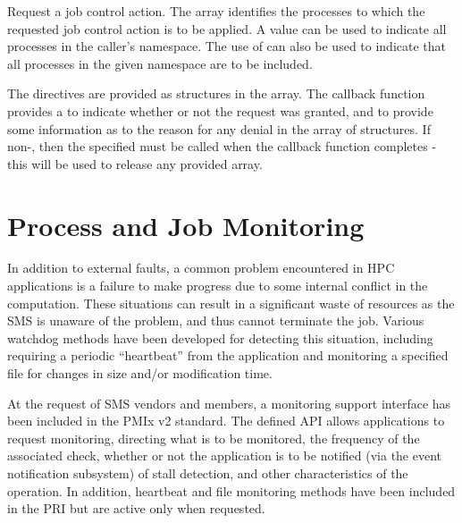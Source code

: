 \descr

Request a job control action.
The  array identifies the processes to which the requested job control action is to be applied.
A  value can be used to indicate all processes in the caller's namespace.
The use of  can also be used to indicate that all processes in the given namespace are to be included.

The directives are provided as  structures in the  array.
The callback function provides a  to indicate whether or not the request was granted, and to provide some information as to the reason for any denial in the  array of  structures.
If non-, then the specified  must be called when the callback function completes - this will be used to release any provided  array.


\section{Process and Job Monitoring}
\label{chap:api_job_mgmt:monitor}

In addition to external faults, a common problem encountered in \ac{HPC} applications is a failure to make
progress due to some internal conflict in the computation. These situations can
result in a significant waste of resources as the \ac{SMS} is unaware of the problem, and thus cannot terminate the
job. Various watchdog methods have been developed for detecting this situation, including requiring a periodic ``heartbeat''
from the application and monitoring a specified file for changes in size and/or modification time.

At the request of \ac{SMS} vendors and members, a monitoring support interface has been included in the PMIx v2 standard. The defined \ac{API} allows applications to request monitoring, directing what is to be monitored, the frequency of the associated check, whether or not the application is to be notified (via the event notification subsystem) of stall detection, and other characteristics of the operation. In addition, heartbeat and file monitoring methods have been included in the \ac{PRI} but are active only when requested.

\subsection{}

